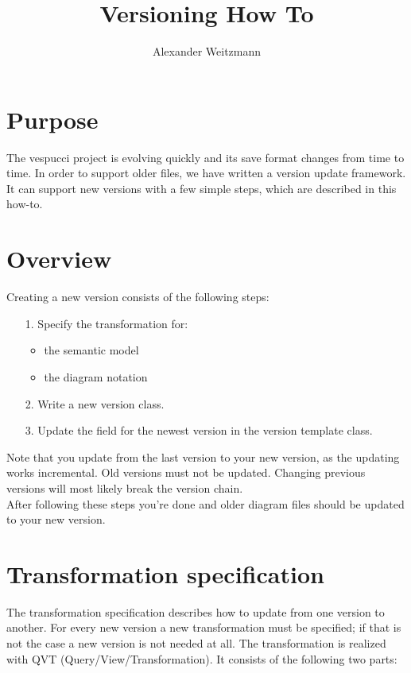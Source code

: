\documentclass[12pt,a4paper,oneside]{report}
\author{Alexander Weitzmann}
\title{Versioning How To}
\begin{document}
\thispagestyle{empty}
\maketitle

\section*{Purpose}
The vespucci project is evolving quickly and its save format changes from time to time. In order to support older files, we have written a version update framework. It can support new versions with a few simple steps, which are described in this how-to.

\section*{Overview}
Creating a new version consists of the following steps:\\
\begin{itemize}
	\item[1.] Specify the transformation for:
	\begin{itemize}
		\item the semantic model
		\item the diagram notation
	\end{itemize}
	\item[2.] Write a new version class.
	\item[3.] Update the field for the newest version in the version template class.
\end{itemize}
\medskip
Note that you update from the last version to your new version, as the updating works incremental. Old versions must not be updated. Changing previous versions will most likely break the version chain.\\
After following these steps you're done and older diagram files should be updated to your new version. 
\newpage

\section*{Transformation specification}
The transformation specification describes how to update from one version to another. For every new  version a new transformation must be specified; if that is not the case a new version is not needed at all. The transformation is realized with QVT (Query/View/Transformation). It consists of the following two parts:\\
\end{document}
